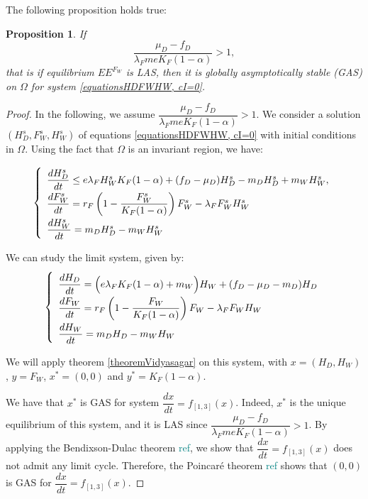 \documentclass{article}
\newcommand{\lfw}{\lambda_{F}}
\newcommand{\lfw}{\lambda_{F}}
\newcommand{\marc}[1]{\textcolor{teal}{#1}}
\newtheorem{prop}{Proposition}
\begin{document}
The following proposition holds true:

\begin{prop}\label{propEEFGAS}If 
$$
\dfrac{\mu_D - f_D}{\lfw m e K_F(1-\alpha)} >1,
$$
that is if equilibrium $EE^{F_W}$ is LAS, then it is globally asymptotically stable (GAS) on $\Omega$ for system \eqref{equationsHDFWHW, cI=0}.
\end{prop}

\begin{proof}
In the following, we assume $\dfrac{\mu_D - f_D}{\lfw m e K_F(1-\alpha)} >1$. We consider a solution $(H_D^s, F_W^s, H_W^s)$ of equations \eqref{equationsHDFWHW, cI=0} with initial conditions in $\Omega$. Using the fact that $\Omega$ is an invariant region, we have:

\begin{equation}
\def\arraystretch{2}
\left\{ \begin{array}{l}
\dfrac{dH^s_D}{dt} \leq e\lfw H^s_W K_F(1-\alpha) + (f_D - \mu_D) H^s_D - m_D H^s_D + m_W H^s_W , \\
\dfrac{dF^s_W}{dt} = r_F \left(1 - \dfrac{F^s_W}{K_F(1-\alpha)} \right) F^s_W - \lfw F^s_W H^s_W \\
\dfrac{dH^s_W}{dt}= m_D H^s_D - m_W H^s_W 
\end{array} \right.
\end{equation}

We can study the limit system, given by:
\begin{equation}
\def\arraystretch{2}
\left\{ \begin{array}{l}
\dfrac{dH_D}{dt} = \Big(e\lfw K_F(1-\alpha) + m_W\Big)H_W + (f_D - \mu_D - m_D) H_D \\
\dfrac{dF_W}{dt} = r_F \left(1 - \dfrac{F_W}{K_F(1-\alpha)} \right) F_W - \lfw F_W H_W \\
\dfrac{dH_W}{dt}= m_D H_D - m_W H_W 
\end{array} \right.
\label{limitSystem}
\end{equation}

We will apply theorem \ref{theoremVidyasagar} on this system, with $x = (H_D, H_W)$, $y = F_W$, $x^* = (0,0)$ and $y^* = K_F(1- \alpha)$.

We have that $x^*$ is GAS for system $\dfrac{dx}{dt} = f_{[1,3]}(x)$. Indeed, $x^*$ is the unique equilibrium of this system, and it is LAS since $\dfrac{\mu_D - f_D}{\lfw m e K_F(1-\alpha)} >1$. By applying the Bendixson-Dulac theorem \marc{ref}, we show that $\dfrac{dx}{dt} = f_{[1,3]}(x)$ does not admit any limit cycle. Therefore, the Poincaré theorem \marc{ref} shows that $(0, 0)$ is GAS for $\dfrac{dx}{dt} = f_{[1,3]}(x)$.


\end{proof}
\end{document}
